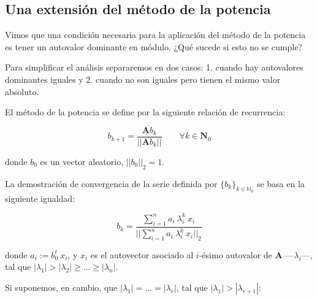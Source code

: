 
\vspace{1em}
\subsection{Una extensión del método de la potencia} \label{ap_A}

Vimos que una condición necesaria para la aplicación del método de la potencia es tener un autovalor dominante en módulo. ¿Qué sucede si esto no se cumple?

\vspace{1em}
\noindent Para simplificar el análisis separaremos en dos casos: 1. cuando hay autovalores dominantes iguales y 2. cuando no son iguales pero tienen el mismo valor absoluto.





\vspace{2em}
El método de la potencia se define por la siguiente relación de recurrencia:

\vspace{1em}
\begin{equation*} 
    b_{k+1} = \frac{\mathbf{A}b_k}{||\mathbf{A}b_k||} \qquad \forall k \in \mathbf{N}_0
\end{equation*}

\vspace{1em}
\noindent donde $b_0$ es un vector aleatorio, $||b_0||_2 = 1$.

\vspace{1em}
\noindent La demostración de convergencia de la serie definida por $\{b_k\}_{k \in \mathbb{N}_0}$ se basa en la siguiente igualdad: 

\begin{equation} \label{eq_potencia}
    b_k = \frac{\sum_{i=1}^{n} a_i \ \lambda_{i}^{k} \ x_i }{||\sum_{i=1}^{n} a_i \ \lambda_{i}^{k} \ x_i||_2}
\end{equation}

\vspace{1em}
\noindent donde $a_i := b_0^t\ x_i$, y $x_i$ es el autovector asociado al $i$-ésimo autovalor de $\mathbf{A}$ ---$\lambda_i$---, tal que $|\lambda_1| > |\lambda_2| \geq ... \geq |\lambda_n|$.

\vspace{2em}
\noindent Si suponemos, en cambio, que $|\lambda_1| = ... = |\lambda_r|$, tal que $|\lambda_1| > |\lambda_{r + 1}|$:

